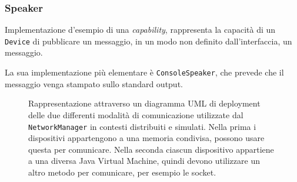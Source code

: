 \subsubsection{Speaker}
Implementazione d'esempio di una \textit{capability}, rappresenta la capacità di un
\texttt{Device} di pubblicare un messaggio, in un modo non definito dall'interfaccia, un
messaggio.

La sua implementazione più elementare è \texttt{ConsoleSpeaker}, che prevede che
il messaggio venga stampato sullo standard output.
\begin{figure}
  \centering
  \hfill
  \caption{Rappresentazione attraverso un diagramma UML di deployment delle due
    differenti modalità di comunicazione utilizzate dal \texttt{NetworkManager}
    in contesti distribuiti e simulati. Nella prima i dispositivi appartengono a
    una memoria condivisa, possono usare questa per comunicare. Nella seconda
    ciascun dispositivo appartiene a una diversa Java Virtual Machine, quindi
    devono utilizzare un altro metodo per comunicare, per esempio le socket.}
\end{figure}
